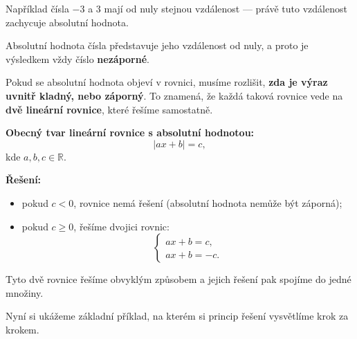 \documentclass[12pt,a4paper]{article}
\begin{document}
\noindent
Například čísla \(-3\) a \(3\) mají od nuly stejnou vzdálenost — právě tuto vzdálenost zachycuje absolutní hodnota.  

\begin{notebox}
Absolutní hodnota čísla představuje jeho vzdálenost od nuly,  
a proto je výsledkem vždy číslo \textbf{nezáporné}.
\end{notebox}

\medskip
Pokud se absolutní hodnota objeví v rovnici, musíme rozlišit,  
\textbf{zda je výraz uvnitř kladný, nebo záporný}.  
To znamená, že každá taková rovnice vede na \textbf{dvě lineární rovnice},  
které řešíme samostatně.

\begin{definitionbox}
\textbf{Obecný tvar lineární rovnice s absolutní hodnotou:}
\[
|ax + b| = c,
\]
kde \(a, b, c \in \mathbb{R}\).

\textbf{Řešení:}
\begin{itemize}
  \item pokud \(c < 0\), rovnice nemá řešení (absolutní hodnota nemůže být záporná);
  \item pokud \(c \ge 0\), řešíme dvojici rovnic:
  \[
  \begin{cases}
  ax + b = c,\\[4pt]
  ax + b = -c.
  \end{cases}
  \]
\end{itemize}
\end{definitionbox}

\noindent
Tyto dvě rovnice řešíme obvyklým způsobem a jejich řešení pak spojíme do jedné množiny.

\medskip
Nyní si ukážeme základní příklad, na kterém si princip řešení vysvětlíme krok za krokem.
\end{document}

